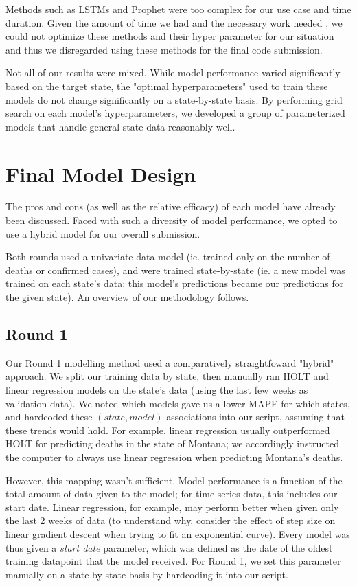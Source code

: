 \documentclass[sigconf,nonacm]{acmart}
\begin{document}
Methods such as LSTMs and Prophet were too complex for our use case and
time duration. Given the amount of time we had and the necessary work needed 
, we could not optimize these methods and their hyper parameter for our
situation and thus we disregarded using these methods for the final code
submission.

Not all of our results were mixed. While model performance varied significantly
based on the target state, the "optimal hyperparameters" used to train these
models do not change significantly on a state-by-state basis. By performing
grid search on each model's hyperparameters, we developed a group of
parameterized models that handle general state data reasonably well. 


\section{Final Model Design}

The pros and cons (as well as the relative efficacy) of each model have already
been discussed. Faced with such a diversity of model performance, we opted to
use a hybrid model for our overall submission. 

Both rounds used a univariate data model (ie. trained only on the number of
deaths or confirmed cases), and were trained state-by-state (ie. a new model
was trained on each state's data; this model's predictions became our
predictions for the given state). An overview of our methodology follows. 

\subsection{Round 1}

Our Round 1 modelling method used a comparatively straightfoward "hybrid"
approach. We split our training data by state, then manually ran HOLT and
linear regression models on the state's data (using the last few weeks as
validation data). We noted which models gave us a lower MAPE for which states,
and hardcoded these $(state, model)$ associations into our script, assuming
that these trends would hold. For example, linear regression usually
outperformed HOLT for predicting deaths in the state of Montana; we accordingly
instructed the computer to always use linear regression when predicting
Montana's deaths. 

However, this mapping wasn't sufficient. 
Model performance is a function of the total amount of data given to the model;
for time series data, this includes our start date. Linear regression, for
example, may perform better when given only the last 2 weeks of data (to
understand why, consider the effect of step size on linear gradient descent
when trying to fit an exponential curve). 
Every model was thus given a \emph{start date} parameter, which was defined as
the date of the oldest training datapoint that the model received. 
For Round 1, we set this parameter manually on a state-by-state basis by
hardcoding it into our script. 
\end{document}
